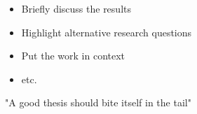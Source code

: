 \begin{itemize}
    \item Briefly discuss the results
    \item Highlight alternative research questions
    \item Put the work in context
    \item etc.
\end{itemize}

"A good thesis should bite itself in the tail"
